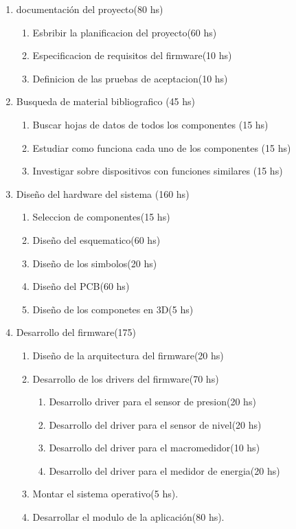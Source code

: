 \documentclass[
11pt, %
codirector, %
]{charter}
\begin{document}
\begin{enumerate}
\item documentación del proyecto(80 hs)
	\begin{enumerate}
	\item Esbribir la planificacion del proyecto(60 hs)
	\item Especificacion de requisitos del firmware(10 hs)
	\item Definicion de las pruebas de aceptacion(10 hs)
	\end{enumerate}
\item Busqueda de material bibliografico (45 hs)
	\begin{enumerate}
	\item Buscar hojas de datos de todos los componentes (15 hs)
	\item Estudiar como funciona cada uno de los componentes (15 hs)
	\item Investigar sobre dispositivos con funciones similares (15 hs)
	\end{enumerate}
\item Diseño del hardware del sistema (160 hs)
	\begin{enumerate}
	\item Seleccion de componentes(15 hs)
	\item Diseño del esquematico(60 hs)
	\item Diseño de los simbolos(20 hs)
	\item Diseño del PCB(60 hs)
	\item Diseño de los componetes en 3D(5 hs)
	\end{enumerate}
\item Desarrollo del firmware(175)
	\begin{enumerate}
	\item Diseño de la arquitectura del firmware(20 hs)
	\item Desarrollo de los drivers del firmware(70 hs)
	\begin{enumerate}
		\item Desarrollo driver para el sensor de presion(20 hs)
		\item Desarrollo del driver para el sensor de nivel(20 hs)
		\item Desarrollo del driver para el macromedidor(10 hs)
		\item Desarrollo del driver para el medidor de energia(20 hs)
	\end{enumerate}
	\item Montar el sistema operativo(5 hs).
	\item Desarrollar el modulo de la aplicación(80 hs).

\end{enumerate}
\end{enumerate}
\end{document}
